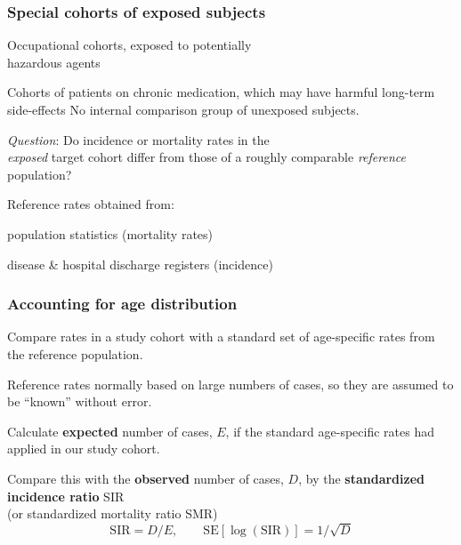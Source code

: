 \documentclass[handout,12pt]{beamer}
\begin{document}
\begin{frame}
 \frametitle{Special cohorts of exposed subjects}
 
\bi
\item
Occupational cohorts, exposed to potentially \\
hazardous agents
\medskip
\item
Cohorts of patients on chronic medication, which may have harmful long-term side-effects
\ei
No internal comparison group of unexposed subjects.

\medskip
{\it Question}:
Do incidence or mortality rates in the \\ {\it exposed} target cohort differ from those of a
roughly comparable \textit{reference} population?

Reference rates obtained from: 
\bi
\item
 population statistics (mortality rates)
 \item
  disease \& hospital discharge registers (incidence)
  \ei
\end{frame} 
\begin{frame} \frametitle{Accounting for age distribution}

\bi
\item Compare rates in a study cohort with a standard set of
  age-specific rates from the reference population.
  \medskip
\item Reference rates normally based on large numbers of cases, so
  they are assumed to be ``known'' without error.
  \medskip
\item Calculate {\bf expected} number of cases, $E$, if the standard
  age-specific rates had applied in our study cohort. 
 \medskip
\item  
  Compare this with the
  {\bf observed} number of cases, $D$, by the {\bf standardized incidence ratio} SIR \\
  (or standardized mortality ratio SMR)
$$ \text{SIR} = D/E, \qquad \text{SE}[\log(\text{SIR})] = 1/\sqrt{D} $$

\ei

\end{frame}
\end{document}
